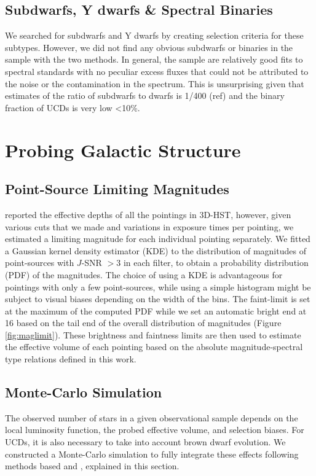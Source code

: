 \documentclass[manuscript]{aastex63}
\begin{document}
\subsection{ Subdwarfs, Y dwarfs  \& Spectral Binaries}
We searched for subdwarfs and Y dwarfs by creating selection criteria for these subtypes. However, we did not find any obvious subdwarfs or binaries in the sample with the two methods. In general, the sample are relatively good fits to spectral standards with no peculiar excess fluxes that could not be attributed to the noise or the contamination in the spectrum. This is unsurprising given that estimates of the ratio of subdwarfs to dwarfs is 1/400 (ref) and the binary fraction of UCDs is very low \textless 10\%. 


\section{Probing Galactic Structure}\label{sec:simulations}

\subsection{ Point-Source Limiting Magnitudes}
\citet{Momcheva2016} reported the effective depths of all the pointings in 3D-HST, however, given various cuts that we made and variations in exposure times per pointing, we estimated a limiting magnitude for each individual pointing separately. We fitted a Gaussian kernel density estimator (KDE) to the distribution of magnitudes of point-sources with $J$-SNR $> 3$ in each filter, to obtain a probability distribution (PDF) of the magnitudes. The choice of using a KDE is advantageous for pointings with only a few point-sources, while using a simple histogram might be subject to visual biases depending on the width of the bins. The faint-limit is set at the maximum of the computed PDF while we set an automatic bright end at 16 based on the tail end of the overall distribution of magnitudes (Figure \ref{fig:maglimit}). These brightness and faintness limits are then used to estimate the effective volume of each pointing based on the absolute magnitude-spectral type relations defined in this work. 

\subsection{Monte-Carlo Simulation}
The observed number of stars in a given observational sample depends on the local luminosity function, the probed effective volume, and selection biases. For UCDs, it is also necessary to take into account brown dwarf evolution. We constructed a Monte-Carlo simulation to fully integrate these effects following methods based \cite{1999ApJ...521..613R} and \cite{2004ApJS..155..191B}, explained in this section.
\end{document}
